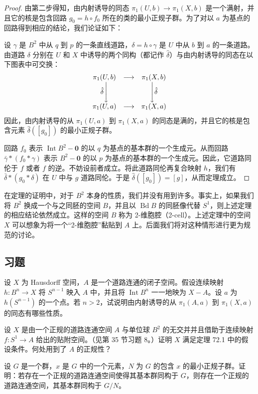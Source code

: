 \documentclass[../../main.tex]{subfiles}
\begin{document}
\begin{proof}
由第二步得知，由内射诱导的同态 $\pi_1(U,b)\to\pi_1(X,b)$ 是一个满射，并且它的核是包含回路 $g_0=h\circ f_0$ 所在的类的最小正规子群。为了对以 $a$ 为基点的回路得到相应的结论，我们论证如下：

设 $\gamma$ 是 $B^2$ 中从 $q$ 到 $p$ 的一条直线道路，$\delta=h\circ\gamma$ 是 $U$ 中从 $b$ 到 $a$ 的一条道路。由道路 $\delta$ 分别在 $U$ 和 $X$ 中诱导的两个同构（都记作 $\hat{\delta}$）与由内射诱导的同态在以下图表中可交换：
\begin{align*}
\begin{matrix}
\pi_1(U,b)&\longrightarrow&\pi_1(X,b)\\
\hat{\delta}\Bigg\downarrow&&\Bigg\downarrow\hat{\delta}\\
\pi_1(U,a)&\longrightarrow&\pi_1(X,a)
\end{matrix}
\end{align*}
因此，由内射诱导的从 $\pi_1(U,a)$ 到 $\pi_1(X,a)$ 的同态是满的，并且它的核是包含元素 $\hat{\delta}([g_0])$ 的最小正规子群。

回路 $f_0$ 表示 $\operatorname{Int}B^2-\mathbf{0}$ 的以 $q$ 为基点的基本群的一个生成元。从而回路 $\bar{\gamma}*(f_0*\gamma)$ 表示 $B^2-\mathbf{0}$ 的以 $p$ 为基点的基本群的一个生成元。因此，它道路同伦于 $f$ 或者 $f$ 的逆。不妨设前者成立。将此道路同伦再复合映射 $h$，我们有 $\bar{\delta}*(g_0*\delta)$ 在 $U$ 中与 $g$ 道路同伦。于是 $\hat{\delta}([g_0])=[g]$，从而定理成立。
\end{proof}

在定理的证明中，对于 $B^2$ 本身的性质，我们并没有用到许多。事实上，如果我们将 $B^2$ 换成一个与之同胚的空间 $B$，并且以 $\operatorname{Bd}B$ 的同胚像代替 $S^1$，则上述定理的相应结论依然成立。这样的空间 $B$ 称为 2-维胞腔（2-cell）。上述定理中的空间 $X$ 可以想象为将一个“2-维胞腔”黏贴到 $A$ 上。后面我们将对这种情形进行更为规范的讨论。

\subsection*{习题}

\begin{exercise}\label{exercise:ch11-72-01}
设 $X$ 为 Hausdorff 空间，$A$ 是一个道路连通的闭子空间。假设连续映射 $h:B^n\to X$ 将 $S^{n-1}$ 映入 $A$ 中，并且将 $\operatorname{Int}B^n$ 一一地映为 $X-A$。设 $a$ 为 $h(S^{n-1})$ 的一个点。若 $n>2$，试说明由内射诱导的从 $\pi_1(A,a)$ 到 $\pi_1(X,a)$ 的同态有哪些性质。
\end{exercise}

\begin{exercise}\label{exercise:ch11-72-02}
设 $X$ 是由一个正规的道路连通空间 $A$ 与单位球 $B^2$ 的无交并并且借助于连续映射 $f:S^1\to A$ 给出的贴附空间。（见第 35 节习题 8。）证明 $X$ 满足定理 72.1 中的假设条件。何处用到了 $A$ 的正规性？
\end{exercise}

\begin{exercise}\label{exercise:ch11-72-03}
设 $G$ 是一个群，$x$ 是 $G$ 中的一个元素，$N$ 为 $G$ 的包含 $x$ 的最小正规子群。证明：若存在一个正规的道路连通空间使得其基本群同构于 $G$，则存在一个正规的道路连通空间，其基本群同构于 $G/N$。
\end{exercise}
\end{document}
